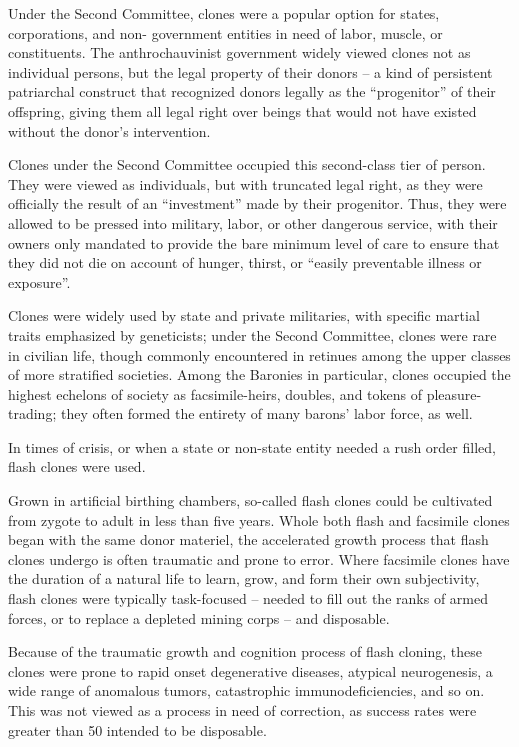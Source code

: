 Under the Second Committee, clones were a popular option for states, corporations, and non- 
government entities in need of labor, muscle, or constituents. The anthrochauvinist government  
widely viewed clones not as individual persons, but the legal property of their donors -- a kind of  
persistent patriarchal construct that recognized donors legally as the “progenitor” of their  
offspring, giving them all legal right over beings that would not have existed without the donor’s  
intervention. 
 

Clones under the Second Committee occupied this second-class tier of person. They were  
viewed as individuals, but with truncated legal right, as they were officially the result of an  
“investment” made by their progenitor. Thus, they were allowed to be pressed into military, labor,  
or other dangerous service, with their owners only mandated to provide the bare minimum level  
of care to ensure that they did not die on account of hunger, thirst, or “easily preventable illness  
or exposure”. 
 

                                                                                                         


Clones were widely used by state and private militaries, with specific martial traits emphasized  
by geneticists; under the Second Committee, clones were rare in civilian life, though commonly  
encountered in retinues among the upper classes of more stratified societies. Among the  
Baronies in particular, clones occupied the highest echelons of society as facsimile-heirs,  
doubles, and tokens of pleasure-trading; they often formed the entirety of many barons’ labor  
force, as well. 
 

In times of crisis, or when a state or non-state entity needed a rush order filled, flash clones were  
used. 
 

Grown in artificial birthing chambers, so-called flash clones could be cultivated from zygote to  
adult in less than five years. Whole both flash and facsimile clones began with the same donor  
materiel, the accelerated growth process that flash clones undergo is often traumatic and prone  
to error. Where facsimile clones have the duration of a natural life to learn, grow, and form their  
own subjectivity, flash clones were typically task-focused -- needed to fill out the ranks of armed  
forces, or to replace a depleted mining corps -- and disposable. 
 

Because of the traumatic growth and cognition process of flash cloning, these clones were prone  
to rapid onset degenerative diseases, atypical neurogenesis, a wide range of anomalous tumors,  
catastrophic immunodeficiencies, and so on. This was not viewed as a process in need of  
correction, as success rates were greater than 50%
intended to be disposable. 
 


